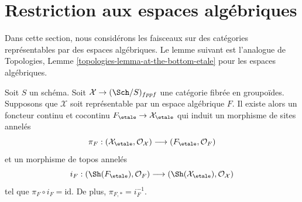 \section{Restriction aux espaces algébriques}
\label{section-restriction-algebraic-spaces}

\noindent
Dans cette section, nous considérons les faisceaux sur des catégories représentables par des
espaces algébriques. Le lemme suivant est l'analogue de
Topologies, Lemme \ref{topologies-lemma-at-the-bottom-etale}
pour les espaces algébriques.

\begin{lemma}
\label{lemma-compare}
Soit $S$ un schéma. Soit $\mathcal{X} \to (\Sch/S)_{fppf}$ une catégorie
fibrée en groupoïdes. Supposons que $\mathcal{X}$ soit représentable par un espace
algébrique $F$. Il existe alors un foncteur continu et cocontinu
$
F_\etale \to \mathcal{X}_\etale
$
qui induit un morphisme de sites annelés
$$
\pi_F :
(\mathcal{X}_\etale, \mathcal{O}_\mathcal{X})
\longrightarrow
(F_\etale, \mathcal{O}_F)
$$
et un morphisme de topos annelés
$$
i_F :
(\Sh(F_\etale), \mathcal{O}_F)
\longrightarrow
(\Sh(\mathcal{X}_\etale), \mathcal{O}_\mathcal{X})
$$
tel que $\pi_F \circ i_F = \text{id}$. De plus, $\pi_{F, *} = i_F^{-1}$.
\end{lemma}

